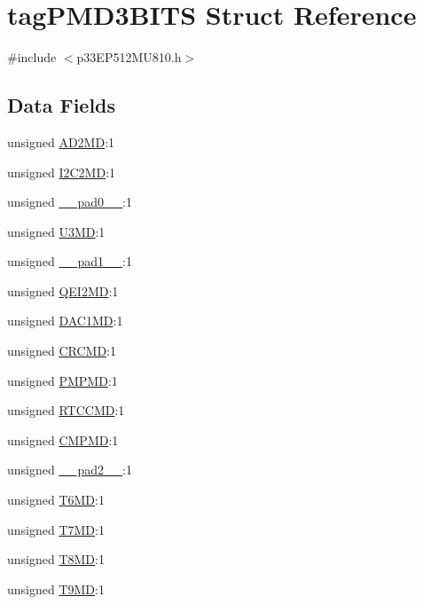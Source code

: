 \hypertarget{structtag_p_m_d3_b_i_t_s}{}\section{tag\+P\+M\+D3\+B\+I\+TS Struct Reference}
\label{structtag_p_m_d3_b_i_t_s}


{\ttfamily \#include $<$p33\+E\+P512\+M\+U810.\+h$>$}

\subsection*{Data Fields}
\begin{DoxyCompactItemize}
\item 
unsigned \hyperlink{structtag_p_m_d3_b_i_t_s_a6093c95caf4402453506492aeb708cf8}{A\+D2\+MD}\+:1
\item 
unsigned \hyperlink{structtag_p_m_d3_b_i_t_s_abfe5bca6d701a398f56d5c56cd8720c8}{I2\+C2\+MD}\+:1
\item 
unsigned \hyperlink{structtag_p_m_d3_b_i_t_s_adf71f3d8410c1f1dbbc96680a92c49af}{\+\_\+\+\_\+pad0\+\_\+\+\_\+}\+:1
\item 
unsigned \hyperlink{structtag_p_m_d3_b_i_t_s_a2d90cb556ec531738b99f8ce71c8d287}{U3\+MD}\+:1
\item 
unsigned \hyperlink{structtag_p_m_d3_b_i_t_s_acaf2d0924a107ec6e8d2e31febaf66f9}{\+\_\+\+\_\+pad1\+\_\+\+\_\+}\+:1
\item 
unsigned \hyperlink{structtag_p_m_d3_b_i_t_s_a8e9bef64fb8d00e42cc96449e2d8682f}{Q\+E\+I2\+MD}\+:1
\item 
unsigned \hyperlink{structtag_p_m_d3_b_i_t_s_a4bfe06b5de40931fc6a87ed27111afe0}{D\+A\+C1\+MD}\+:1
\item 
unsigned \hyperlink{structtag_p_m_d3_b_i_t_s_a30b14fb3fec4cee371ba55dbad5dbd9a}{C\+R\+C\+MD}\+:1
\item 
unsigned \hyperlink{structtag_p_m_d3_b_i_t_s_ac809859b6746472be0a76e9eb83607f9}{P\+M\+P\+MD}\+:1
\item 
unsigned \hyperlink{structtag_p_m_d3_b_i_t_s_ad3656266a6bb4ea81faf1b21f174b655}{R\+T\+C\+C\+MD}\+:1
\item 
unsigned \hyperlink{structtag_p_m_d3_b_i_t_s_a969ba7fb9ccc46c8cb37fd1885787e45}{C\+M\+P\+MD}\+:1
\item 
unsigned \hyperlink{structtag_p_m_d3_b_i_t_s_a4d97cc5f7d51d22fc2bf3eab35c9cb7f}{\+\_\+\+\_\+pad2\+\_\+\+\_\+}\+:1
\item 
unsigned \hyperlink{structtag_p_m_d3_b_i_t_s_a33aabc64cf8b1d09d423c189db4ee685}{T6\+MD}\+:1
\item 
unsigned \hyperlink{structtag_p_m_d3_b_i_t_s_a85950e07d98978229200d8087b39c448}{T7\+MD}\+:1
\item 
unsigned \hyperlink{structtag_p_m_d3_b_i_t_s_a8c32b7e20a750f3cd99d2090792e83b8}{T8\+MD}\+:1
\item 
unsigned \hyperlink{structtag_p_m_d3_b_i_t_s_aa389f814b1a07a4a6e1a99e1b453e212}{T9\+MD}\+:1
\end{DoxyCompactItemize}


